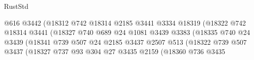 \begin{lexlean}{RustStd}
\begin{coremodule}
                                            @616
                                            @3442
                                            (@18312
                                              @742
                                              @18314
                                              @2185
                                              @3441
                                              @3334
                                              @18319
                                              (@18322
                                                @742
                                                @18314
                                                @3441
                                                (@18327
                                                  @740
                                                  @689
                                                  @24
                                                  @1081
                                                  @3439
                                                  @3383
                                                  (@18335
                                                    @740
                                                    @24
                                                    @3439
                                                    (@18341
                                                      @739
                                                      @507
                                                      @24
                                                      @2185
                                                      @3437
                                                      @2507
                                                      @513
                                                      (@18322
                                                        @739
                                                        @507
                                                        @3437
                                                        (@18327
                                                          @737
                                                          @93
                                                          @304
                                                          @27
                                                          @3435
                                                          @2159
                                                          (@18360
                                                            @736
                                                            @3435

\end{coremodule}
\end{lexlean}
